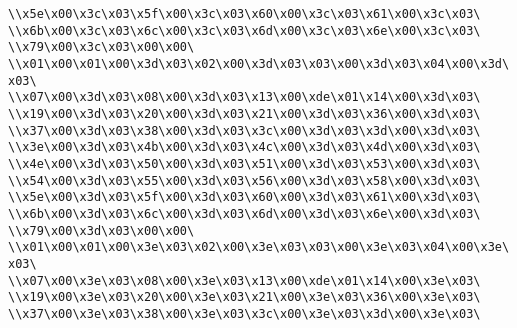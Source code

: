 \verb|\\x5e\x00\x3c\x03\x5f\x00\x3c\x03\x60\x00\x3c\x03\x61\x00\x3c\x03\|\newline
\verb|\\x6b\x00\x3c\x03\x6c\x00\x3c\x03\x6d\x00\x3c\x03\x6e\x00\x3c\x03\|\newline
\verb|\\x79\x00\x3c\x03\x00\x00\|\newline
\verb|\\x01\x00\x01\x00\x3d\x03\x02\x00\x3d\x03\x03\x00\x3d\x03\x04\x00\x3d\x03\|\newline
\verb|\\x07\x00\x3d\x03\x08\x00\x3d\x03\x13\x00\xde\x01\x14\x00\x3d\x03\|\newline
\verb|\\x19\x00\x3d\x03\x20\x00\x3d\x03\x21\x00\x3d\x03\x36\x00\x3d\x03\|\newline
\verb|\\x37\x00\x3d\x03\x38\x00\x3d\x03\x3c\x00\x3d\x03\x3d\x00\x3d\x03\|\newline
\verb|\\x3e\x00\x3d\x03\x4b\x00\x3d\x03\x4c\x00\x3d\x03\x4d\x00\x3d\x03\|\newline
\verb|\\x4e\x00\x3d\x03\x50\x00\x3d\x03\x51\x00\x3d\x03\x53\x00\x3d\x03\|\newline
\verb|\\x54\x00\x3d\x03\x55\x00\x3d\x03\x56\x00\x3d\x03\x58\x00\x3d\x03\|\newline
\verb|\\x5e\x00\x3d\x03\x5f\x00\x3d\x03\x60\x00\x3d\x03\x61\x00\x3d\x03\|\newline
\verb|\\x6b\x00\x3d\x03\x6c\x00\x3d\x03\x6d\x00\x3d\x03\x6e\x00\x3d\x03\|\newline
\verb|\\x79\x00\x3d\x03\x00\x00\|\newline
\verb|\\x01\x00\x01\x00\x3e\x03\x02\x00\x3e\x03\x03\x00\x3e\x03\x04\x00\x3e\x03\|\newline
\verb|\\x07\x00\x3e\x03\x08\x00\x3e\x03\x13\x00\xde\x01\x14\x00\x3e\x03\|\newline
\verb|\\x19\x00\x3e\x03\x20\x00\x3e\x03\x21\x00\x3e\x03\x36\x00\x3e\x03\|\newline
\verb|\\x37\x00\x3e\x03\x38\x00\x3e\x03\x3c\x00\x3e\x03\x3d\x00\x3e\x03\|\newline
